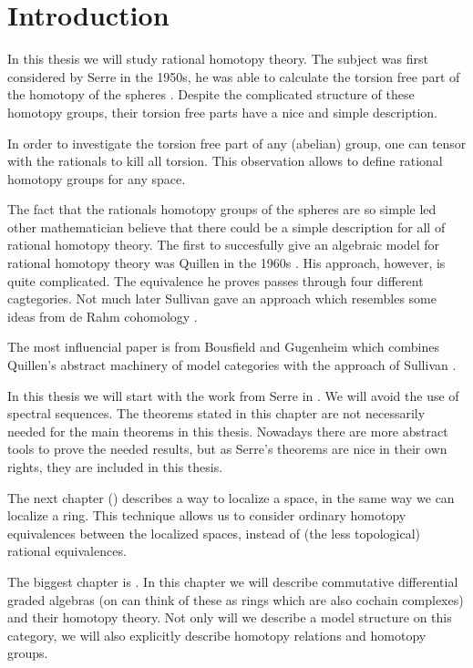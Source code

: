 
\chapter*{Introduction}

In this thesis we will study rational homotopy theory. The subject was first considered by Serre in the 1950s, he was able to calculate the torsion free part of the homotopy of the spheres \cite{serre}. Despite the complicated structure of these homotopy groups, their torsion free parts have a nice and simple description.

In order to investigate the torsion free part of any (abelian) group, one can tensor with the rationals to kill all torsion. This observation allows to define rational homotopy groups for any space.

The fact that the rationals homotopy groups of the spheres are so simple led other mathematician believe that there could be a simple description for all of rational homotopy theory. The first to succesfully give an algebraic model for rational homotopy theory was Quillen in the 1960s \cite{quillen}. His approach, however, is quite complicated. The equivalence he proves passes through four different cagtegories. Not much later Sullivan gave an approach which resembles some ideas from de Rahm cohomology \cite{sullivan}.

The most influencial paper is from Bousfield and Gugenheim which combines Quillen's abstract machinery of model categories with the approach of Sullivan \cite{bousfield}.

In this thesis we will start with the work from Serre in . We will avoid the use of spectral sequences. The theorems stated in this chapter are not necessarily needed for the main theorems in this thesis. Nowadays there are more abstract tools to prove the needed results, but as Serre's theorems are nice in their own rights, they are included in this thesis.

The next chapter () describes a way to localize a space, in the same way we can localize a ring. This technique allows us to consider ordinary homotopy equivalences between the localized spaces, instead of (the less topological) rational equivalences.

The biggest chapter is . In this chapter we will describe commutative differential graded algebras (on can think of these as rings which are also cochain complexes) and their homotopy theory. Not only will we describe a model structure on this category, we will also explicitly describe homotopy relations and homotopy groups.

